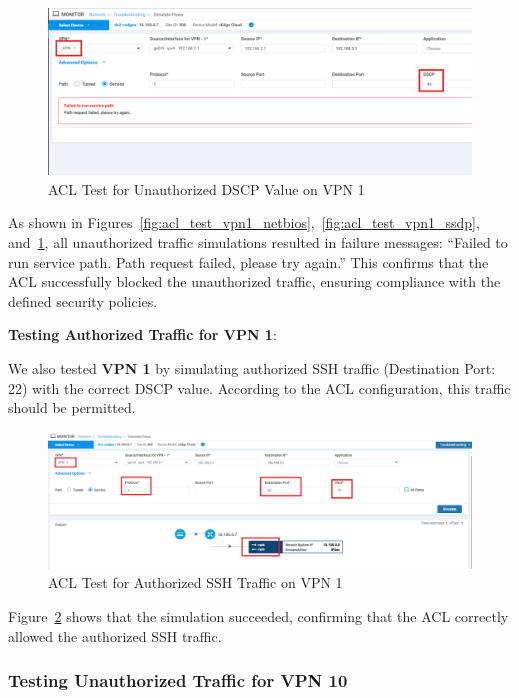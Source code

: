 \documentclass[12pt,english]{report}
\begin{document}
\begin{figure}[H]
    \centering
    \includegraphics[width=1\textwidth]{chapter 4/jdid/vpn1_wrdscp.png}
    \caption{ACL Test for Unauthorized DSCP Value on VPN 1}
    \label{fig:acl_test_vpn1_dscp}
\end{figure}

As shown in Figures~\ref{fig:acl_test_vpn1_netbios},~\ref{fig:acl_test_vpn1_ssdp}, and~\ref{fig:acl_test_vpn1_dscp}, all unauthorized traffic simulations resulted in failure messages: “Failed to run service path. Path request failed, please try again.” This confirms that the ACL successfully blocked the unauthorized traffic, ensuring compliance with the defined security policies.

\textbf{Testing Authorized Traffic for VPN 1}:

We also tested \textbf{VPN 1} by simulating authorized SSH traffic (Destination Port: 22) with the correct DSCP value. According to the ACL configuration, this traffic should be permitted.

\begin{figure}[H]
    \centering
    \includegraphics[width=1\textwidth]{chapter 4/jdid/vpn1_correct.png}
    \caption{ACL Test for Authorized SSH Traffic on VPN 1}
    \label{fig:acl_test_vpn1_ssh}
\end{figure}

Figure~\ref{fig:acl_test_vpn1_ssh} shows that the simulation succeeded, confirming that the ACL correctly allowed the authorized SSH traffic.

\subsubsection{Testing Unauthorized Traffic for VPN 10}
\end{document}
